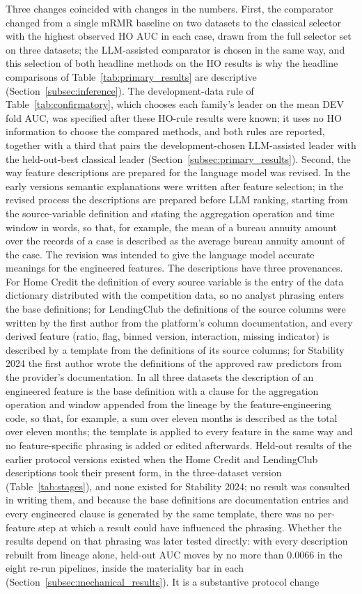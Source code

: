 \documentclass[final,5p,twocolumn]{elsarticle}
\begin{document}
Three changes coincided with changes in the numbers. First, the comparator changed from a single mRMR baseline on two datasets to the classical selector with the highest observed HO AUC in each case, drawn from the full selector set on three datasets; the LLM-assisted comparator is chosen in the same way, and this selection of both headline methods on the HO results is why the headline comparisons of Table~\ref{tab:primary_results} are descriptive (Section~\ref{subsec:inference}). The development-data rule of Table~\ref{tab:confirmatory}, which chooses each family's leader on the mean DEV fold AUC, was specified after these HO-rule results were known; it uses no HO information to choose the compared methods, and both rules are reported, together with a third that pairs the development-chosen LLM-assisted leader with the held-out-best classical leader (Section~\ref{subsec:primary_results}). Second, the way feature descriptions are prepared for the language model was revised. In the early versions semantic explanations were written after feature selection; in the revised process the descriptions are prepared before LLM ranking, starting from the source-variable definition and stating the aggregation operation and time window in words, so that, for example, the mean of a bureau annuity amount over the records of a case is described as the average bureau annuity amount of the case. The revision was intended to give the language model accurate meanings for the engineered features. The descriptions have three provenances. For Home Credit the definition of every source variable is the entry of the data dictionary distributed with the competition data, so no analyst phrasing enters the base definitions; for LendingClub the definitions of the source columns were written by the first author from the platform's column documentation, and every derived feature (ratio, flag, binned version, interaction, missing indicator) is described by a template from the definitions of its source columns; for Stability 2024 the first author wrote the definitions of the approved raw predictors from the provider's documentation. In all three datasets the description of an engineered feature is the base definition with a clause for the aggregation operation and window appended from the lineage by the feature-engineering code, so that, for example, a sum over eleven months is described as the total over eleven months; the template is applied to every feature in the same way and no feature-specific phrasing is added or edited afterwards. Held-out results of the earlier protocol versions existed when the Home Credit and LendingClub descriptions took their present form, in the three-dataset version (Table~\ref{tab:stages}), and none existed for Stability 2024; no result was consulted in writing them, and because the base definitions are documentation entries and every engineered clause is generated by the same template, there was no per-feature step at which a result could have influenced the phrasing. Whether the results depend on that phrasing was later tested directly: with every description rebuilt from lineage alone, held-out AUC moves by no more than 0.0066 in the eight re-run pipelines, inside the materiality bar in each (Section~\ref{subsec:mechanical_results}). It is a substantive protocol change 
\end{document}
